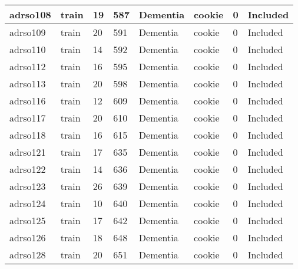 \begin{center}
\begin{longtable}{|l|l|l|l|l|l|l|l|}
adrso108  & train            & 19           & 587         & Dementia             & cookie          & 0                & Included      \\ \hline
adrso109  & train            & 20           & 591         & Dementia             & cookie          & 0                & Included      \\ \hline
adrso110  & train            & 14           & 592         & Dementia             & cookie          & 0                & Included      \\ \hline
adrso112  & train            & 16           & 595         & Dementia             & cookie          & 0                & Included      \\ \hline
adrso113  & train            & 20           & 598         & Dementia             & cookie          & 0                & Included      \\ \hline
adrso116  & train            & 12           & 609         & Dementia             & cookie          & 0                & Included      \\ \hline
adrso117  & train            & 20           & 610         & Dementia             & cookie          & 0                & Included      \\ \hline
adrso118  & train            & 16           & 615         & Dementia             & cookie          & 0                & Included      \\ \hline
adrso121  & train            & 17           & 635         & Dementia             & cookie          & 0                & Included      \\ \hline
adrso122  & train            & 14           & 636         & Dementia             & cookie          & 0                & Included      \\ \hline
adrso123  & train            & 26           & 639         & Dementia             & cookie          & 0                & Included      \\ \hline
adrso124  & train            & 10           & 640         & Dementia             & cookie          & 0                & Included      \\ \hline
adrso125  & train            & 17           & 642         & Dementia             & cookie          & 0                & Included      \\ \hline
adrso126  & train            & 18           & 648         & Dementia             & cookie          & 0                & Included      \\ \hline
adrso128  & train            & 20           & 651         & Dementia             & cookie          & 0                & Included      \\ \hline

\end{longtable}
\end{center}
